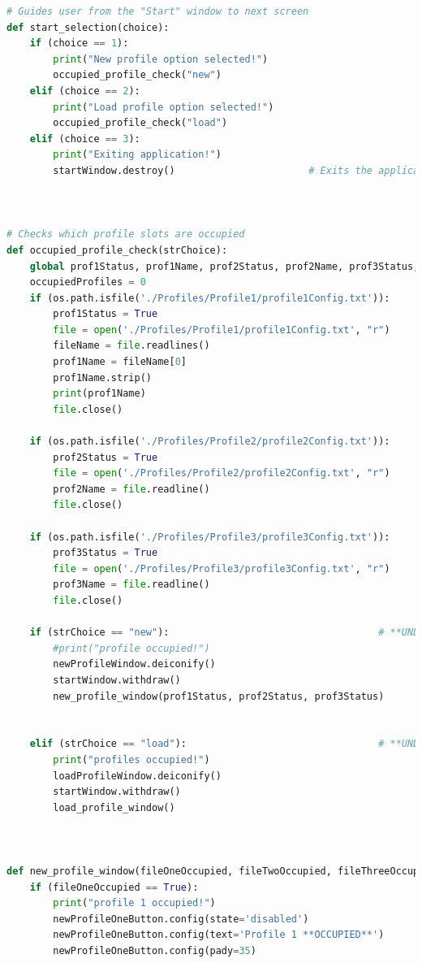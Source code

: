 \documentclass[conference]{IEEEtran}
\begin{document}
\begin{lstlisting}[language=Python, caption=GUI CODE, label=gui_code]
# Guides user from the "Start" window to next screen
def start_selection(choice):
    if (choice == 1):
        print("New profile option selected!")
        occupied_profile_check("new")
    elif (choice == 2):
        print("Load profile option selected!")
        occupied_profile_check("load")
    elif (choice == 3):
        print("Exiting application!")
        startWindow.destroy()                       # Exits the application



# Checks which profile slots are occupied
def occupied_profile_check(strChoice):
    global prof1Status, prof1Name, prof2Status, prof2Name, prof3Status, prof3Name
    occupiedProfiles = 0
    if (os.path.isfile('./Profiles/Profile1/profile1Config.txt')):
        prof1Status = True
        file = open('./Profiles/Profile1/profile1Config.txt', "r")
        fileName = file.readlines()
        prof1Name = fileName[0]
        prof1Name.strip()
        print(prof1Name)
        file.close()

    if (os.path.isfile('./Profiles/Profile2/profile2Config.txt')):
        prof2Status = True
        file = open('./Profiles/Profile2/profile2Config.txt', "r")
        prof2Name = file.readline()
        file.close()

    if (os.path.isfile('./Profiles/Profile3/profile3Config.txt')):
        prof3Status = True
        file = open('./Profiles/Profile3/profile3Config.txt', "r")
        prof3Name = file.readline()
        file.close()

    if (strChoice == "new"):                                    # **UNDER CONSTRUCTION** If ALL profiles are occupied AND "New Profile" was selected
        #print("profile occupied!")
        newProfileWindow.deiconify()
        startWindow.withdraw()
        new_profile_window(prof1Status, prof2Status, prof3Status)


    elif (strChoice == "load"):                                 # **UNDER CONSTRUCTION** If NO profiles are occupied AND "Load Profile" was selected
        print("profiles occupied!")
        loadProfileWindow.deiconify()
        startWindow.withdraw()
        load_profile_window()
    


def new_profile_window(fileOneOccupied, fileTwoOccupied, fileThreeOccupied):
    if (fileOneOccupied == True):
        print("profile 1 occupied!")
        newProfileOneButton.config(state='disabled')
        newProfileOneButton.config(text='Profile 1 **OCCUPIED**')
        newProfileOneButton.config(pady=35)


\end{lstlisting}
\end{document}
